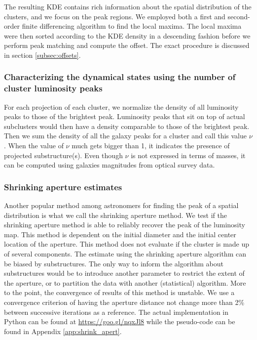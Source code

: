 The resulting KDE contains rich information about the spatial distribution of
the clusters, and we focus on the peak regions.  
We employed both a first and second-order  
finite differencing algorithm to find the local maxima.  
The local maxima were then sorted according to the KDE density in a descending
fashion before we perform peak matching and compute the offset. The exact
procedure is discussed in section \ref{subsec:offsets}. 

\subsubsection{Characterizing the dynamical states using the number of cluster
luminosity peaks}
\label{subsubsec:nu}
For each projection of each cluster, we normalize the density of all 
luminosity peaks to those of the brightest peak. 
Luminosity peaks that sit on top of actual subclusters would then have a density 
comparable to those of the brightest peak. 
Then we sum the density of all the galaxy peaks for a cluster and call this value
$\nu$. When the value of $\nu$ much gets bigger than 1, it indicates the presence 
of projected substructure(s). Even though 
$\nu$ is not expressed in terms of masses, it can be computed using galaxies
magnitudes from optical survey data. 

\subsubsection{Shrinking aperture estimates}

Another popular method among astronomers for finding the peak of a spatial
distribution is what we call the shrinking aperture method.
We test if the shrinking aperture method is able to reliably recover the 
peak of the luminosity map.
This method is dependent on the initial diameter and the initial center 
location of the aperture.
This method does not evaluate if the cluster is made up of
several components.
The estimate using the shrinking aperture algorithm can be biased by
substructures. The only way to inform the algorithm about substructures would
be to introduce another parameter to restrict the extent of the aperture, or to
partition the data with another (statistical) algorithm.
More to the point, the convergence of results of this method is unstable. We use a
convergence criterion of having the aperture distance not change more than 2\% 
between successive iterations as a reference. The actual implementation in
{\sc Python} can be found at \href{https://goo.gl/nqxJl8}{https://goo.gl/nqxJl8} while
the pseudo-code can be found in Appendix \ref{app:shrink_apert}.

